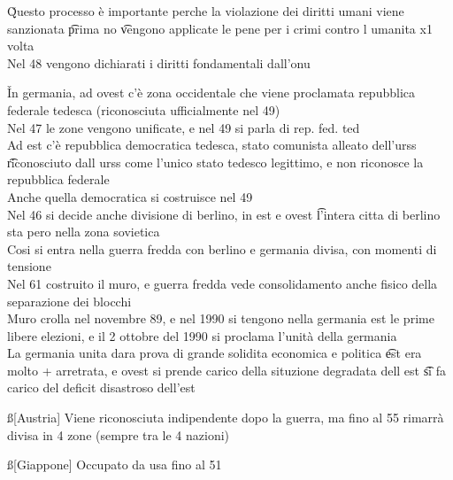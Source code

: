\documentclass[12pt]{article}
\begin{document}
\v

Questo processo è importante perche la violazione dei diritti umani viene sanzionata \t prima no \t vengono applicate le pene per i crimi contro l umanita x1 volta \\
Nel 48 vengono dichiarati i diritti fondamentali dall'onu

\v

In germania, ad ovest c'è zona occidentale che viene proclamata repubblica federale tedesca (riconosciuta ufficialmente nel 49) \\
Nel 47 le zone vengono unificate, e nel 49 si parla di rep. fed. ted \\
Ad est c'è repubblica democratica tedesca, stato comunista alleato dell'urss \t riconosciuto dall urss come l'unico stato tedesco legittimo, e non riconosce la repubblica federale \\
Anche quella democratica si costruisce nel 49 \\
Nel 46 si decide anche divisione di berlino, in est e ovest \t l'intera citta di berlino sta pero nella zona sovietica \\
Cosi si entra nella guerra fredda con berlino e germania divisa, con momenti di tensione \\
Nel 61 costruito il muro, e guerra fredda vede consolidamento anche fisico della separazione dei blocchi \\
Muro crolla nel novembre 89, e nel 1990 si tengono nella germania est le prime libere elezioni, e il 2 ottobre del 1990 si proclama l'unità della germania \\
La germania unita dara prova di grande solidita economica e politica \t est era molto + arretrata, e ovest si prende carico della situzione degradata dell est \t si fa carico del deficit disastroso dell'est

\ss[Austria]
Viene riconosciuta indipendente dopo la guerra, ma fino al 55 rimarrà divisa in 4 zone (sempre tra le 4 nazioni)

\ss[Giappone]
Occupato da usa fino al 51
\end{document}
